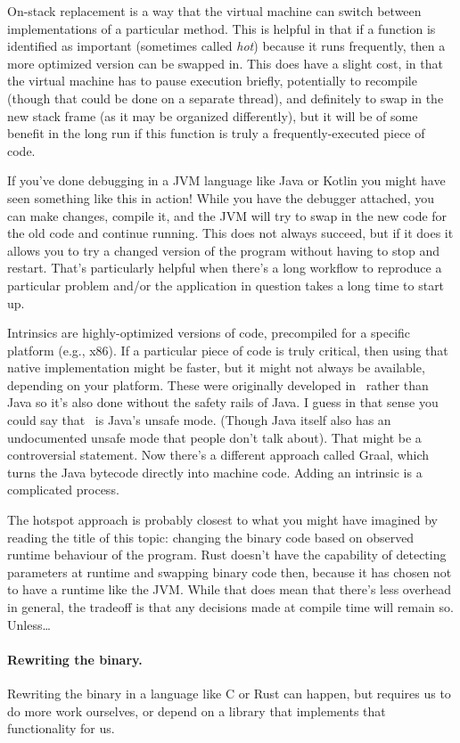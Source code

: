 On-stack replacement is a way that the virtual machine can switch between implementations of a particular method. This is helpful in that if a function is identified as important (sometimes called \textit{hot}) because it runs frequently, then a more optimized version can be swapped in. This does have a slight cost, in that the virtual machine has to pause execution briefly, potentially to recompile (though that could be done on a separate thread), and definitely to swap in the new stack frame (as it may be organized differently), but it will be of some benefit in the long run if this function is truly a frequently-executed piece of code.

If you've done debugging in a JVM language like Java or Kotlin you might have seen something like this in action! While you have the debugger attached, you can make changes, compile it, and the JVM will try to swap in the new code for the old code and continue running. This does not always succeed, but if it does it allows you to try a changed version of the program without having to stop and restart. That's particularly helpful when there's a long workflow to reproduce a particular problem and/or the application in question takes a long time to start up.

Intrinsics are highly-optimized versions of code, precompiled for a specific platform (e.g., x86). If a particular piece of code is truly critical, then using that native implementation might be faster, but it might not always be available, depending on your platform. These were originally developed in \CPP~rather than Java so it's also done without the safety rails of Java. I guess in that sense you could say that \CPP~is Java's unsafe mode. (Though Java itself also has an undocumented unsafe mode that people don't talk about). That might be a controversial statement. Now there's a different approach called Graal, which turns the Java bytecode directly into machine code. Adding an intrinsic is a complicated process.

The hotspot approach is probably closest to what you might have imagined by reading the title of this topic: changing the binary code based on observed runtime behaviour of the program. Rust doesn't have the capability of detecting parameters at runtime and swapping binary code then, because it has chosen not to have a runtime like the JVM. While that does mean that there's less overhead in general, the tradeoff is that any decisions made at compile time will remain so. Unless\ldots

\paragraph{Rewriting the binary.}
Rewriting the binary in a language like C or Rust can happen, but requires us to do more work ourselves, or depend on a library that implements that functionality for us.

